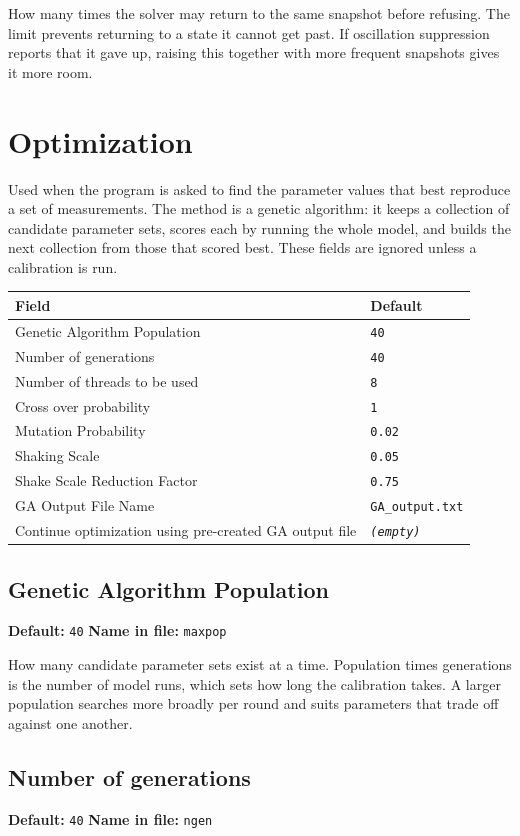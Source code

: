 \documentclass[11pt]{article}
\begin{document}
How many times the solver may return to the same snapshot before refusing. The limit prevents returning to a state it cannot get past. If oscillation suppression reports that it gave up, raising this together with more frequent snapshots gives it more room.
\section{Optimization}
Used when the program is asked to find the parameter values that best reproduce a set of measurements. The method is a genetic algorithm: it keeps a collection of candidate parameter sets, scores each by running the whole model, and builds the next collection from those that scored best. These fields are ignored unless a calibration is run.
\begin{longtable}{@{}p{}p{}@{}}
\toprule \textrm{Field} & \textrm{Default} \\ \midrule \endhead
Genetic Algorithm Population & \texttt{\small 40} \\
Number of generations & \texttt{\small 40} \\
Number of threads to be used & \texttt{\small 8} \\
Cross over probability & \texttt{\small 1} \\
Mutation Probability & \texttt{\small 0.\allowbreak{}02} \\
Shaking Scale & \texttt{\small 0.\allowbreak{}05} \\
Shake Scale Reduction Factor & \texttt{\small 0.\allowbreak{}75} \\
GA Output File Name & \texttt{\small GA\_\allowbreak{}output.\allowbreak{}txt} \\
Continue optimization using pre-created GA output file & \texttt{\small \textit{(empty)}} \\
\bottomrule\end{longtable}
\subsection{Genetic Algorithm Population}
{\small \textbf{Default:} \texttt{40} \quad\textbullet\quad \textbf{Name in file:} \texttt{maxpop}}

How many candidate parameter sets exist at a time. Population times generations is the number of model runs, which sets how long the calibration takes. A larger population searches more broadly per round and suits parameters that trade off against one another.
\subsection{Number of generations}
{\small \textbf{Default:} \texttt{40} \quad\textbullet\quad \textbf{Name in file:} \texttt{ngen}}
\end{document}
